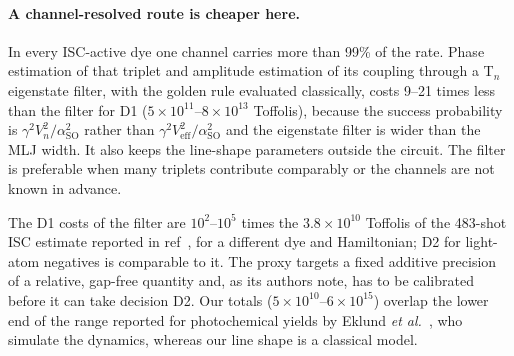 \documentclass[journal=jctcce,manuscript=article,layout=twocolumn]{achemso}
\newcommand{\aso}{\alpha_\mathrm{SO}}
\begin{document}
\paragraph{A channel-resolved route is cheaper here.} In every ISC-active dye one channel carries more than
99\% of the rate. Phase estimation of that triplet and amplitude estimation of its coupling through a T$_n$
eigenstate filter, with the golden rule evaluated classically, costs 9--21 times less than the filter for
D1 ($5\times10^{11}$--$8\times10^{13}$ Toffolis), because the success probability is $\gamma^2V_n^2/\aso^2$
rather than $\gamma^2V_\mathrm{eff}^2/\aso^2$ and the eigenstate filter is wider than the MLJ width. It also
keeps the line-shape parameters outside the circuit. The filter is preferable when many triplets contribute
comparably or the channels are not known in advance.

The D1 costs of the filter are $10^{2}$--$10^{5}$ times the $3.8\times10^{10}$ Toffolis of the 483-shot ISC
estimate reported in ref~, for a different dye and Hamiltonian; D2 for light-atom
negatives is comparable to it. The proxy targets a fixed additive precision of a relative, gap-free quantity
and, as its authors note, has to be calibrated before it can take decision D2. Our totals
($5\times10^{10}$--$6\times10^{15}$) overlap the lower end of the range reported for photochemical yields by
Eklund \emph{et al.}~\cite{Eklund2026}, who simulate the dynamics, whereas our line shape is a classical model.
\end{document}
